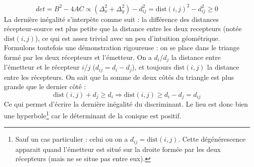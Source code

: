 \documentclass[10pt,a4paper]{article}
\begin{document}
\begin{equation}
det = B^2 - 4AC \propto (\Delta_x^2 + \Delta_y^2) - d_{ij}^2 = \mathrm{dist}(i,j)^2 - d_{ij}^2\geq 0
\end{equation}
La dernière inégalité s'interpète comme suit : la différence des distances récepteur-source est plus petite que la distance entre les deux recepteurs (notée $\mathrm{dist}(i,j)$), ce qui est assez trivial avec un peu d'intuition géométrique. Formulons toutefois une démonstration rigoureuse : on se place dans le triange formé par les deux récepteurs et l'émetteur. On a $d_i$/$d_j$ la distance entre l'émetteur et le récepteur $i$/$j$ ($d_{ij} = d_i - d_j$), et toujours $\mathrm{dist}(i,j)$ la distance entre les récepteurs. On sait que la somme de deux côtés du triangle est plus grande que le dernier côté :
\begin{equation}
\mathrm{dist}(i,j) + d_j \geq d_i \Rightarrow \mathrm{dist}(i,j) \geq d_i - d_j = d_{ij}
\end{equation}
Ce qui permet d'écrire la dernière inégalité du discriminant. Le lieu est donc bien une hyperbole\footnote{Sauf un cas particulier : celui ou on a $d_{ij} = \mathrm{dist}(i,j)$. Cette dégénérescence apparait quand l'émetteur est situé sur la droite formée par les deux récepteurs (mais ne se situe pas entre eux).} car le déterminant de la conique est positif.
\end{document}
